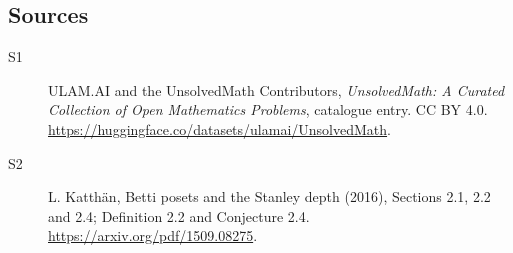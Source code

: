 \documentclass[11pt]{article}
\begin{document}
\subsection{Sources}
\begin{description}
\item[\hypertarget{source:statement:1}{S1}] ULAM.AI and the UnsolvedMath Contributors, \emph{UnsolvedMath: A Curated Collection of Open Mathematics Problems}, catalogue entry. CC BY 4.0. \url{https://huggingface.co/datasets/ulamai/UnsolvedMath}.
\item[\hypertarget{source:statement:2}{S2}] L. Katthän, Betti posets and the Stanley depth (2016), Sections 2.1, 2.2 and 2.4; Definition 2.2 and Conjecture 2.4. \url{https://arxiv.org/pdf/1509.08275}.
\end{description}
\label{end:statement}
\end{document}
